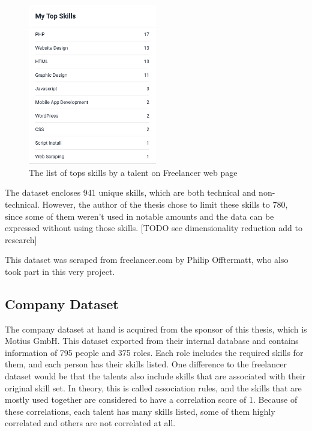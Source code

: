 \begin{figure}[!ht]
	\centering
	\includegraphics[width=0.5\textwidth]{figures/FreelancerTalentSkills.png}
	\caption{The list of tops skills by a talent on Freelancer web page}
	\label{fig:freelancer-talent-talent}
\end{figure}


The dataset encloses  941 unique skills, which are both technical and non-technical. However, the author of the thesis chose to limit these skills to 780, since some of them weren't used in notable amounts and the data can be expressed without using those skills. [TODO see dimensionality reduction add to research]


This dataset was scraped from freelancer.com by Philip Offtermatt, who also took part in this very project.


\subsection{Company Dataset}\label{subsection:company-dataset}

The company dataset at hand is acquired from the sponsor of this thesis, which is Motius GmbH. This dataset exported from their internal database and contains information of 795 people and 375 roles. Each role includes the required skills for them, and each person has their skills listed. One difference to the freelancer dataset would be that the talents also include skills that are associated with their original skill set. In theory, this is called association rules, and the skills that are mostly used together are considered to have a correlation score of 1. Because of these correlations, each talent has many skills listed, some of them highly correlated and others are not correlated at all.


